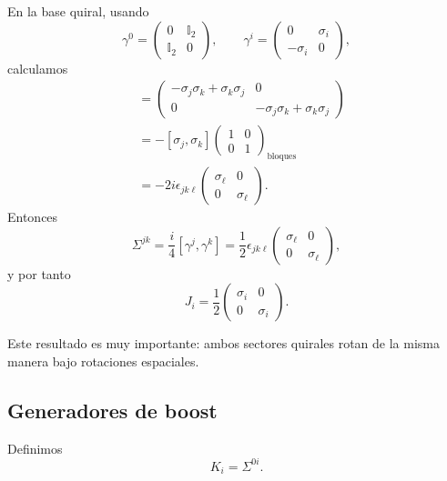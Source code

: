 En la base quiral, usando
\begin{equation}
\gamma^0=
\begin{pmatrix}
0 & \mathbb{I}_2\\
\mathbb{I}_2 & 0
\end{pmatrix},
\qquad
\gamma^i=
\begin{pmatrix}
0 & \sigma_i\\
-\sigma_i & 0
\end{pmatrix},
\end{equation}
calculamos
\begin{align}
[\gamma^j,\gamma^k]
&=
\begin{pmatrix}
-\sigma_j\sigma_k+\sigma_k\sigma_j & 0\\
0 & -\sigma_j\sigma_k+\sigma_k\sigma_j
\end{pmatrix}
\\
&=
-[\sigma_j,\sigma_k]
\begin{pmatrix}
1 & 0\\
0 & 1
\end{pmatrix}_{\text{bloques}}
\\
&=
-2i\epsilon_{jk\ell}
\begin{pmatrix}
\sigma_\ell & 0\\
0 & \sigma_\ell
\end{pmatrix}.
\end{align}
Entonces
\begin{equation}
\Sigma^{jk}
=
\frac{i}{4}[\gamma^j,\gamma^k]
=
\frac{1}{2}\epsilon_{jk\ell}
\begin{pmatrix}
\sigma_\ell & 0\\
0 & \sigma_\ell
\end{pmatrix},
\end{equation}
y por tanto
\begin{equation}
\boxed{
J_i=
\frac{1}{2}
\begin{pmatrix}
\sigma_i & 0\\
0 & \sigma_i
\end{pmatrix}.
}
\label{c16:eq:Jmatrix}
\end{equation}

Este resultado es muy importante: ambos sectores quirales rotan de la misma manera bajo rotaciones espaciales.

\subsection{Generadores de boost}
Definimos
\begin{equation}
K_i = \Sigma^{0i}.
\label{c16:eq:Kdef}
\end{equation}

